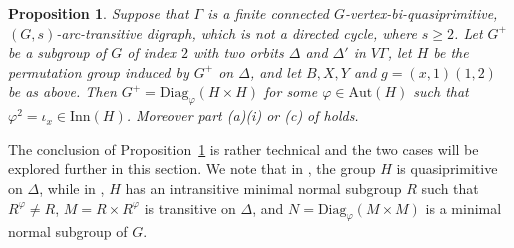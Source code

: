 \documentclass[11pt]{amsart}
\newtheorem{proposition}[theorem]{Proposition}
\newcommand{\Soc}{\mathrm{Soc}}
\newcommand{\Aut}{\mathrm{Aut}}
\newcommand{\Inn}{\mathrm{Inn}}
\newcommand{\Diag}{\mathrm{Diag}}
\begin{document}


\begin{proposition}\label{Biquasi0}
    Suppose that \(\Gamma\) is a finite connected \(G\)-vertex-bi-quasiprimitive, \((G,s)\)-arc-trans\-itive digraph,  which is not a directed cycle, where \(s\geqslant2\). Let \(G^+\) be a subgroup of \(G\) of index \(2\) with two orbits \(\Delta\) and \(\Delta'\) in \(V\Gamma\), let \(H\) be the permutation group induced by \(G^+\) on \(\Delta\), and let $B, X, Y$ and $g=(x,1)(1,2)$ be as above.  Then \(G^+=\Diag_{\varphi}(H\times H)\) for some \(\varphi\in\Aut(H)\) such that $\varphi^2=\iota_x\in\Inn(H)$. Moreover part (a)(i) or (c) of \cite[Theorem 1.1]{Praeger03} holds.
    \end{proposition}

The conclusion of Proposition~\ref{Biquasi0} is rather technical and the two cases will be explored further in this section. We note that in \cite[Theorem 1.1(a)(i)]{Praeger03}, the group $H$ is quasiprimitive on $\Delta$, while in \cite[Theorem 1.1(c)]{Praeger03}, $H$ has an intransitive minimal normal subgroup $R$ such that $R^\varphi\ne R$, $M=R\times R^\varphi$ is transitive on $\Delta$, and $N=\Diag_\varphi(M\times M)$ is a minimal normal subgroup of $G$. 
\end{document}

